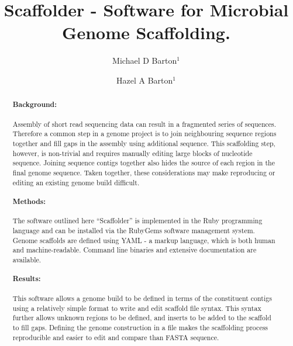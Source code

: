 \documentclass[10pt]{bmc_article}
\newenvironment{bmcformat}{\begin{raggedright}\baselineskip20pt\sloppy\setboolean{publ}{false}}{\end{raggedright}\baselineskip20pt\sloppy}
\begin{document}
\begin{bmcformat}

\title{Scaffolder - Software for Microbial Genome Scaffolding.} %

\author{
  Michael D Barton$^{1}$\correspondingauthor%
\and
  Hazel A Barton$^1$%
      }

\address{\iid(1) Department of Biological Sciences, Northern Kentucky %
University, Nunn Drive, Highland Heights, KY 41076 }%

\maketitle

\clearpage

\begin{abstract} %

  \paragraph*{Background:} Assembly of short read sequencing data can result in
  a fragmented series of sequences. Therefore a common step in a genome project
  is to join neighbouring sequence regions together and fill gaps in the
  assembly using additional sequence. This scaffolding step, however, is
  non-trivial and requires manually editing large blocks of nucleotide
  sequence. Joining sequence contigs together also hides the source of each
  region in the final genome sequence. Taken together, these considerations may
  make reproducing or editing an existing genome build difficult.

  \paragraph*{Methods:} The software outlined here ``Scaffolder'' is
  implemented in the Ruby programming language and can be installed via the
  RubyGems software management system. Genome scaffolds are defined using
  YAML - a markup language, which is both human and machine-readable. Command
  line binaries and extensive documentation are available.

  \paragraph*{Results:} This software allows a genome build to be defined in
  terms of the constituent contigs using a relatively simple format to write
  and edit scaffold file syntax. This syntax further allows  unknown regions to
  be defined, and inserts to be added to the scaffold to fill gaps. Defining
  the genome construction in a file makes the scaffolding process reproducible
  and easier to edit and compare than FASTA sequence.


\end{abstract}
\end{bmcformat}
\end{document}
